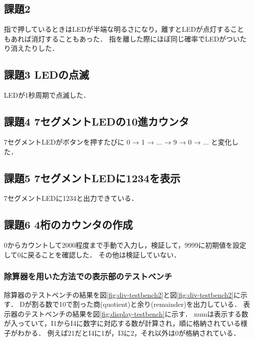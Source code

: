 \subsection{課題2}
指で押しているときはLEDが半端な明るさになり，離すとLEDが点灯することもあれば消灯することもあった．
指を離した際にほぼ同じ確率でLEDがついたり消えたりした．

\subsection{課題3 LEDの点滅}
LEDが1秒周期で点滅した．

\subsection{課題4 7セグメントLEDの10進カウンタ}
7セグメントLEDがボタンを押すたびに 0 → 1 → ... → 9 → 0 → ... と変化した．

\subsection{課題5 7セグメントLEDに1234を表示}
7セグメントLEDに1234と出力できている．

\subsection{課題6 4桁のカウンタの作成}
0からカウントして2000程度まで手動で入力し，検証して，9999に初期値を設定して0に戻ることを確認した．
その他は検証していない．
\subsubsection{除算器を用いた方法での表示部のテストベンチ}
除算器のテストベンチの結果を図\ref{fig:div-testbench2}と図\ref{fig:div-testbench2}に示す．
Dが割る数で10で割った商(quotient)と余り(remainder)を出力している．
表示器のテストベンチの結果を図\ref{fig:display-testbench}に示す．
numは表示する数が入っていて，I1からI4に数字に対応する数が計算され，順に格納されている様子がわかる．
例えば21だとI4に1が，I3に2，それ以外は0が格納されている．

